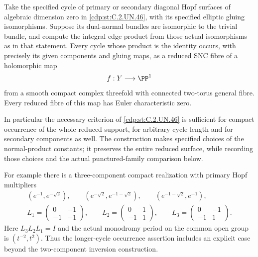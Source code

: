 
\begin{proposition}\label{cdp:st:C.2.UN.48}
Take the specified cycle of primary or secondary diagonal
Hopf surfaces of algebraic dimension zero in \ref{cdp:st:C.2.UN.46},
with its specified elliptic gluing isomorphisms.
Suppose its dual-normal bundles are isomorphic to the
trivial bundle, and compute the integral edge product
from those actual isomorphisms as in that statement.
Every cycle whose product is the identity occurs,
with precisely its given components and gluing maps,
as a reduced SNC fibre of a holomorphic map
\[
                 f:Y\longrightarrow\PP^1
\]
from a smooth compact complex threefold with connected
two-torus general fibre. Every reduced fibre of this
map has Euler characteristic zero.

In particular the necessary criterion of \ref{cdp:st:C.2.UN.46}
is sufficient for compact occurrence of the whole
reduced support, for arbitrary cycle length and for
secondary components as well. The construction makes
specified choices of the normal-product constants;
it preserves the entire reduced surface, while
recording those choices and the actual punctured-family
comparison below.

For example there is a three-component compact
realization with primary Hopf multipliers
\[
 \begin{gathered}
 (e^{-1},e^{-\sqrt2}),\qquad
 (e^{-\sqrt2},e^{-1-\sqrt2}),\qquad
 (e^{-1-\sqrt2},e^{-1}),\\
 L_1=\begin{pmatrix}0&-1\\-1&-1\end{pmatrix},\qquad
 L_2=\begin{pmatrix}0&1\\-1&1\end{pmatrix},\qquad
 L_3=\begin{pmatrix}0&-1\\-1&1\end{pmatrix}.
 \end{gathered}
 \tag{C.HG.1}\label{cdp:eq:C.HG.1}
\]
Here $L_3L_2L_1=I$ and the actual monodromy period
on the common open group is $(t^{-2},t^2)$.
Thus the longer-cycle occurrence assertion includes
an explicit case beyond the two-component inversion
construction.
\end{proposition}

